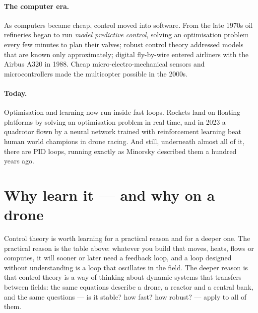 \paragraph{The computer era.} As computers became cheap, control moved into software. From the late 1970s oil refineries began to run \emph{model predictive control}, solving an optimisation problem every few minutes to plan their valves; robust control theory addressed models that are known only approximately; digital fly-by-wire entered airliners with the Airbus A320 in 1988. Cheap micro-electro-mechanical sensors and microcontrollers made the multicopter possible in the 2000s.

\paragraph{Today.} Optimisation and learning now run inside fast loops. Rockets land on floating platforms by solving an optimisation problem in real time, and in 2023 a quadrotor flown by a neural network trained with reinforcement learning beat human world champions in drone racing. And still, underneath almost all of it, there are PID loops, running exactly as Minorsky described them a hundred years ago.

\section{Why learn it — and why on a drone}

Control theory is worth learning for a practical reason and for a deeper one. The practical reason is the table above: whatever you build that moves, heats, flows or computes, it will sooner or later need a feedback loop, and a loop designed without understanding is a loop that oscillates in the field. The deeper reason is that control theory is a way of thinking about dynamic systems that transfers between fields: the same equations describe a drone, a reactor and a central bank, and the same questions — is it stable? how fast? how robust? — apply to all of them.

